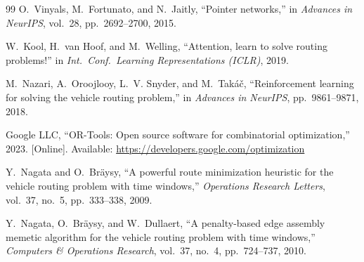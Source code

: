 \documentclass[journal]{IEEEtran}
\begin{document}
\begin{thebibliography}{99}
O.~Vinyals, M.~Fortunato, and N.~Jaitly,
``Pointer networks,''
in \textit{Advances in NeurIPS}, vol.~28, pp.~2692--2700, 2015.

W.~Kool, H.~van Hoof, and M.~Welling,
``Attention, learn to solve routing problems!''
in \textit{Int.\ Conf.\ Learning Representations (ICLR)}, 2019.

M.~Nazari, A.~Oroojlooy, L.~V. Snyder, and M.~Tak\'{a}\v{c},
``Reinforcement learning for solving the vehicle routing problem,''
in \textit{Advances in NeurIPS}, pp.~9861--9871, 2018.

Google LLC,
``OR-Tools: Open source software for combinatorial optimization,''
2023. [Online]. Available: \url{https://developers.google.com/optimization}

Y.~Nagata and O.~Br\"aysy,
``A powerful route minimization heuristic for the vehicle routing problem with
time windows,''
\textit{Operations Research Letters}, vol.~37, no.~5, pp.~333--338, 2009.

Y.~Nagata, O.~Br\"aysy, and W.~Dullaert,
``A penalty-based edge assembly memetic algorithm for the vehicle routing
problem with time windows,''
\textit{Computers \& Operations Research}, vol.~37, no.~4, pp.~724--737, 2010.

\end{thebibliography}
\end{document}

